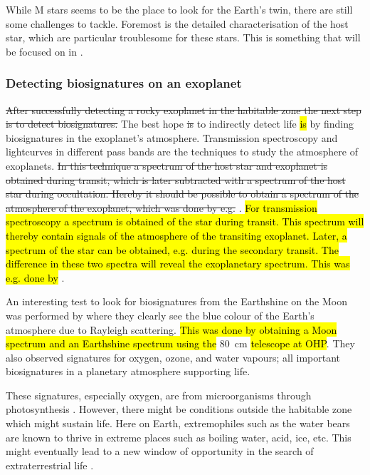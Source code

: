 While M stars seems to be the place to look for the Earth's twin, there are still some challenges to
tackle. Foremost is the detailed characterisation of the host star, which are particular troublesome
for these stars. This is something that will be focused on in .

\subsubsection{Detecting biosignatures on an exoplanet}

\st{After successfully detecting a rocky exoplanet in the habitable zone the next step is to detect
biosignatures.} The best hope \st{is} to indirectly detect life \hl{is} by finding biosignatures
\citep[see e.g.]{Kasting2002,Snellen2013} in the exoplanet's atmosphere. Transmission spectroscopy
and lightcurves in different pass bands are the techniques to study the atmosphere of exoplanets.
\st{In this technique a spectrum of the host star and exoplanet is obtained during transit, which is
later subtracted with a spectrum of the host star during occultation. Hereby it should be possible to
obtain a spectrum of the atmosphere of the exoplanet, which was done by e.g.}
\citet{Charbonneau2002}. \hl{For transmission spectroscopy a spectrum is obtained of the star during
transit. This spectrum will thereby contain signals of the atmosphere of the transiting exoplanet.
Later, a spectrum of the star can be obtained, e.g. during the secondary transit. The difference in
these two spectra will reveal the exoplanetary spectrum. This was e.g. done by}
\citet{Charbonneau2002}.

An interesting test to look for biosignatures from the Earthshine on the Moon was performed by
\citet{Arnold2002} where they clearly see the blue colour of the Earth's atmosphere due to Rayleigh
scattering. \hl{This was done by obtaining a Moon spectrum and an Earthshine spectrum using the}
\SI{80}{cm} \hl{telescope at OHP}. They also observed signatures for oxygen, ozone, and water
vapours; all important biosignatures in a planetary atmosphere supporting life.

These signatures, especially oxygen, are from microorganisms through photosynthesis
\citep[see e.g.][]{Kasting2002}. However, there might be conditions outside the habitable zone which
might sustain life. Here on Earth, extremophiles such as the water bears are known to thrive in
extreme places such as boiling water, acid, ice, etc. This might eventually lead to a new window of
opportunity in the search of extraterrestrial life \citep{Cavicchioli2002}.



